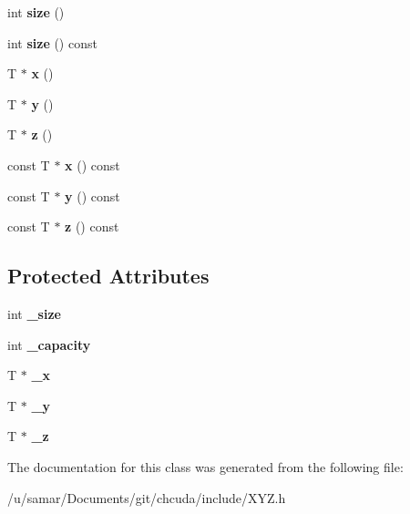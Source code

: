 \begin{DoxyCompactItemize}
int {\bfseries size} ()
\item 
\hypertarget{classXYZ_a1b477643e1b5bbf1dced15bd6f5a56b1}{}\label{classXYZ_a1b477643e1b5bbf1dced15bd6f5a56b1} 
int {\bfseries size} () const
\item 
\hypertarget{classXYZ_a895142942cf937bbb8e16bec27cc132e}{}\label{classXYZ_a895142942cf937bbb8e16bec27cc132e} 
T $\ast$ {\bfseries x} ()
\item 
\hypertarget{classXYZ_a526423fc05e368999a519845d030a1bf}{}\label{classXYZ_a526423fc05e368999a519845d030a1bf} 
T $\ast$ {\bfseries y} ()
\item 
\hypertarget{classXYZ_abbbabb6bfdfcd0cfe01c1edec309ada8}{}\label{classXYZ_abbbabb6bfdfcd0cfe01c1edec309ada8} 
T $\ast$ {\bfseries z} ()
\item 
\hypertarget{classXYZ_add765a587a163c9f3fd213265021a738}{}\label{classXYZ_add765a587a163c9f3fd213265021a738} 
const T $\ast$ {\bfseries x} () const
\item 
\hypertarget{classXYZ_ae5b2be1c378c9c9914fcdf39a3f8dc9f}{}\label{classXYZ_ae5b2be1c378c9c9914fcdf39a3f8dc9f} 
const T $\ast$ {\bfseries y} () const
\item 
\hypertarget{classXYZ_a4bfe5e359c00cb49c99d75126fdc815f}{}\label{classXYZ_a4bfe5e359c00cb49c99d75126fdc815f} 
const T $\ast$ {\bfseries z} () const
\end{DoxyCompactItemize}
\subsection*{Protected Attributes}
\begin{DoxyCompactItemize}
\item 
\hypertarget{classXYZ_ae2f04dea56a813c97c9fb744bcd4bd5b}{}\label{classXYZ_ae2f04dea56a813c97c9fb744bcd4bd5b} 
int {\bfseries \+\_\+size}
\item 
\hypertarget{classXYZ_a99cf8beb331e391a1459eef5481b717a}{}\label{classXYZ_a99cf8beb331e391a1459eef5481b717a} 
int {\bfseries \+\_\+capacity}
\item 
\hypertarget{classXYZ_a03cce19bc05a4fc7a1b5d94e4a634d3e}{}\label{classXYZ_a03cce19bc05a4fc7a1b5d94e4a634d3e} 
T $\ast$ {\bfseries \+\_\+x}
\item 
\hypertarget{classXYZ_a4d78e4c4329cf83472189a031e3c5b7f}{}\label{classXYZ_a4d78e4c4329cf83472189a031e3c5b7f} 
T $\ast$ {\bfseries \+\_\+y}
\item 
\hypertarget{classXYZ_a75bab83bcc37b459f50d6e166860ffa7}{}\label{classXYZ_a75bab83bcc37b459f50d6e166860ffa7} 
T $\ast$ {\bfseries \+\_\+z}
\end{DoxyCompactItemize}


The documentation for this class was generated from the following file\+:\begin{DoxyCompactItemize}
\item 
/u/samar/\+Documents/git/chcuda/include/X\+Y\+Z.\+h\end{DoxyCompactItemize}

